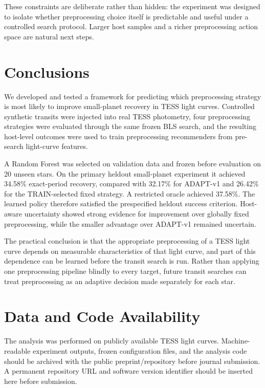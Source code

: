 \documentclass[10pt,twocolumn]{article}
\begin{document}
These constraints are deliberate rather than hidden: the experiment was designed to isolate whether preprocessing choice itself is predictable and useful under a controlled search protocol. Larger host samples and a richer preprocessing action space are natural next steps.

\section{Conclusions}

We developed and tested a framework for predicting which preprocessing strategy is most likely to improve small-planet recovery in TESS light curves. Controlled synthetic transits were injected into real TESS photometry, four preprocessing strategies were evaluated through the same frozen BLS search, and the resulting host-level outcomes were used to train preprocessing recommenders from pre-search light-curve features.

A Random Forest was selected on validation data and frozen before evaluation on 20 unseen stars. On the primary heldout small-planet experiment it achieved 34.58\% exact-period recovery, compared with 32.17\% for ADAPT-v1 and 26.42\% for the TRAIN-selected fixed strategy. A restricted oracle achieved 37.58\%. The learned policy therefore satisfied the prespecified heldout success criterion. Host-aware uncertainty showed strong evidence for improvement over globally fixed preprocessing, while the smaller advantage over ADAPT-v1 remained uncertain.

The practical conclusion is that the appropriate preprocessing of a TESS light curve depends on measurable characteristics of that light curve, and part of this dependence can be learned before the transit search is run. Rather than applying one preprocessing pipeline blindly to every target, future transit searches can treat preprocessing as an adaptive decision made separately for each star.

\section*{Data and Code Availability}

The analysis was performed on publicly available TESS light curves. Machine-readable experiment outputs, frozen configuration files, and the analysis code should be archived with the public preprint/repository before journal submission. A permanent repository URL and software version identifier should be inserted here before submission.
\end{document}

